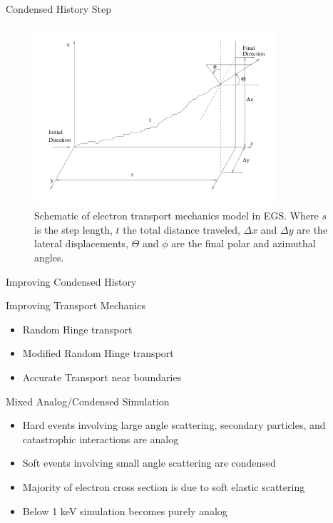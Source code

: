 \documentclass{beamer}
\begin{document}
\begin{frame}{Condensed History Step}
  
\begin{figure}
  \centering
  \includegraphics[width=90mm]{electron_step.png}
  \caption{Schematic of electron transport mechanics model in EGS. Where $s$ is the step length, $t$ the total distance traveled, $\Delta x$ and $\Delta y$ are the lateral displacements, $\Theta$ and $\phi$ are the final polar and azimuthal angles.}
\end{figure}

\end{frame}

\begin{frame}{Improving Condensed History}

\begin{block}{Improving Transport Mechanics}
  
  \begin{itemize}
    \item Random Hinge transport
    \item Modified Random Hinge transport
    \item Accurate Transport near boundaries
  \end{itemize}
  
\end{block}  

\begin{block}{Mixed Analog/Condensed Simulation}
  
  \begin{itemize}
    \item Hard events involving large angle scattering, secondary particles, and catastrophic interactions are analog
    \item Soft events involving small angle scattering are condensed
    \item Majority of electron cross section is due to soft elastic scattering
    \item Below 1 keV simulation becomes purely analog
  \end{itemize}
  
\end{block}  

\end{frame}
\end{document}

